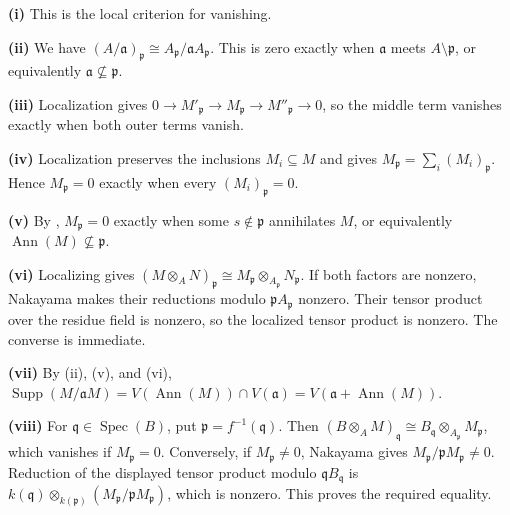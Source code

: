 \textbf{(i)} This is the local criterion for vanishing.

\textbf{(ii)} We have $(A/\mathfrak a)_{\mathfrak p}\cong A_{\mathfrak p}/\mathfrak aA_{\mathfrak p}$. This is zero exactly when $\mathfrak a$ meets $A\setminus\mathfrak p$, or equivalently $\mathfrak a\nsubseteq\mathfrak p$.

\textbf{(iii)} Localization gives $0\to M'_{\mathfrak p}\to M_{\mathfrak p}\to M''_{\mathfrak p}\to0$, so the middle term vanishes exactly when both outer terms vanish.

\textbf{(iv)} Localization preserves the inclusions $M_i\subseteq M$ and gives $M_{\mathfrak p}=\sum_i(M_i)_{\mathfrak p}$. Hence $M_{\mathfrak p}=0$ exactly when every $(M_i)_{\mathfrak p}=0$.

\textbf{(v)} By , $M_{\mathfrak p}=0$ exactly when some $s\notin\mathfrak p$ annihilates $M$, or equivalently $\operatorname{Ann}(M)\nsubseteq\mathfrak p$.

\textbf{(vi)} Localizing gives $(M\otimes_A N)_{\mathfrak p}\cong M_{\mathfrak p}\otimes_{A_{\mathfrak p}}N_{\mathfrak p}$. If both factors are nonzero, Nakayama makes their reductions modulo $\mathfrak pA_{\mathfrak p}$ nonzero. Their tensor product over the residue field is nonzero, so the localized tensor product is nonzero. The converse is immediate.

\textbf{(vii)} By (ii), (v), and (vi), $\operatorname{Supp}(M/\mathfrak aM)=V(\operatorname{Ann}(M))\cap V(\mathfrak a)=V(\mathfrak a+\operatorname{Ann}(M))$.

\textbf{(viii)} For $\mathfrak q\in\operatorname{Spec}(B)$, put $\mathfrak p=f^{-1}(\mathfrak q)$. Then $(B\otimes_A M)_{\mathfrak q}\cong B_{\mathfrak q}\otimes_{A_{\mathfrak p}}M_{\mathfrak p}$, which vanishes if $M_{\mathfrak p}=0$. Conversely, if $M_{\mathfrak p}\ne0$, Nakayama gives $M_{\mathfrak p}/\mathfrak pM_{\mathfrak p}\ne0$. Reduction of the displayed tensor product modulo $\mathfrak qB_{\mathfrak q}$ is $k(\mathfrak q)\otimes_{k(\mathfrak p)}(M_{\mathfrak p}/\mathfrak pM_{\mathfrak p})$, which is nonzero. This proves the required equality.
